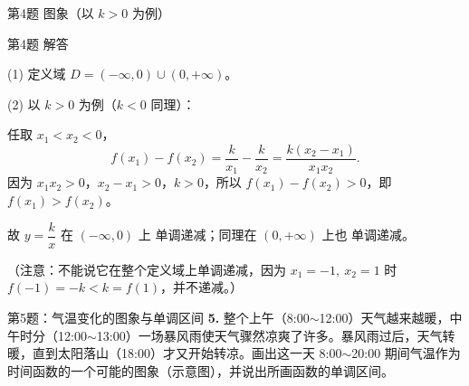 \documentclass[10pt,aspectratio=169,serif]{beamer}
\begin{document}
\begin{frame}[t]{第4题 图象（以 $k>0$ 为例）}
\begin{center}
\end{center}
\end{frame}

\begin{frame}[t]{第4题 解答}
\begin{tcolorbox}[colback=orange!10,colframe=orange,title=\textbf{解}]
(1) 定义域 $D=(-\infty,0)\cup(0,+\infty)$。

\vspace{0.3em}
(2) 以 $k>0$ 为例（$k<0$ 同理）：

任取 $x_1<x_2<0$，
\[
f(x_1)-f(x_2)=\frac{k}{x_1}-\frac{k}{x_2}=\frac{k(x_2-x_1)}{x_1x_2}.
\]
因为 $x_1x_2>0$，$x_2-x_1>0$，$k>0$，所以 $f(x_1)-f(x_2)>0$，即 $f(x_1)>f(x_2)$。

\vspace{0.3em}
故 $y=\dfrac{k}{x}$ 在 $(-\infty,0)$ 上 \alert{单调递减}；同理在 $(0,+\infty)$ 上也 \alert{单调递减}。

\vspace{0.3em}
\small（注意：不能说它在整个定义域上单调递减，因为 $x_1=-1,\ x_2=1$ 时 $f(-1)=-k<k=f(1)$，并不递减。）
\end{tcolorbox}
\end{frame}

\begin{frame}[t]{第5题：气温变化的图象与单调区间}
\textbf{5.} 整个上午（8:00$\sim$12:00）天气越来越暖，中午时分（12:00$\sim$13:00）一场暴风雨使天气骤然凉爽了许多。暴风雨过后，天气转暖，直到太阳落山（18:00）才又开始转凉。画出这一天 8:00$\sim$20:00 期间气温作为时间函数的一个可能的图象（示意图），并说出所画函数的单调区间。
\end{frame}
\end{document}
